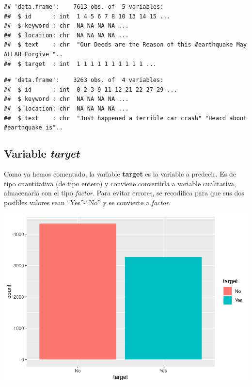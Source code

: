 \documentclass[]{article}
\newenvironment{Shaded}{\begin{snugshade}}{\end{snugshade}}
\newcommand{\DataTypeTok}[1]{\textcolor[rgb]{0.13,0.29,0.53}{#1}}
\newcommand{\DecValTok}[1]{\textcolor[rgb]{0.00,0.00,0.81}{#1}}
\newcommand{\KeywordTok}[1]{\textcolor[rgb]{0.13,0.29,0.53}{\textbf{#1}}}
\newcommand{\NormalTok}[1]{#1}
\newcommand{\OperatorTok}[1]{\textcolor[rgb]{0.81,0.36,0.00}{\textbf{#1}}}
\newcommand{\StringTok}[1]{\textcolor[rgb]{0.31,0.60,0.02}{#1}}
\begin{document}
\begin{verbatim}
## 'data.frame':    7613 obs. of  5 variables:
##  $ id      : int  1 4 5 6 7 8 10 13 14 15 ...
##  $ keyword : chr  NA NA NA NA ...
##  $ location: chr  NA NA NA NA ...
##  $ text    : chr  "Our Deeds are the Reason of this #earthquake May ALLAH Forgive "..
##  $ target  : int  1 1 1 1 1 1 1 1 1 1 ...
\end{verbatim}

\begin{verbatim}
## 'data.frame':    3263 obs. of  4 variables:
##  $ id      : int  0 2 3 9 11 12 21 22 27 29 ...
##  $ keyword : chr  NA NA NA NA ...
##  $ location: chr  NA NA NA NA ...
##  $ text    : chr  "Just happened a terrible car crash" "Heard about #earthquake is"..
\end{verbatim}

\hypertarget{variable-target}{%
\subsection{\texorpdfstring{Variable
\emph{target}}{Variable target}}\label{variable-target}}

Como ya hemos comentado, la variable \textbf{target} es la variable a
predecir. Es de tipo cuantitativa (de tipo entero) y conviene
convertirla a variable cualitativa, almacenarla con el tipo
\emph{factor}. Para evitar errores, se recodifica para que sus dos
posibles valores sean ``Yes''-``No'' y se convierte a \emph{factor}.

\begin{Shaded}
\end{Shaded}

\begin{center}\includegraphics[width=0.7\linewidth]{document_files/figure-latex/unnamed-chunk-4-1} \end{center}
\end{document}
